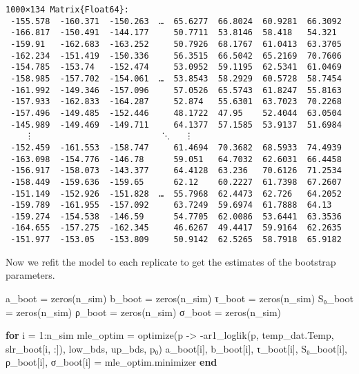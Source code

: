 \documentclass[
  letterpaper,
  DIV=11,
  numbers=noendperiod]{scrartcl}
\newenvironment{Shaded}{\begin{snugshade}}{\end{snugshade}}
\newcommand{\ControlFlowTok}[1]{\textcolor[rgb]{0.00,0.23,0.31}{\textbf{#1}}}
\newcommand{\FloatTok}[1]{\textcolor[rgb]{0.68,0.00,0.00}{#1}}
\newcommand{\FunctionTok}[1]{\textcolor[rgb]{0.28,0.35,0.67}{#1}}
\newcommand{\NormalTok}[1]{\textcolor[rgb]{0.00,0.23,0.31}{#1}}
\newcommand{\OperatorTok}[1]{\textcolor[rgb]{0.37,0.37,0.37}{#1}}
\begin{document}
\begin{verbatim}
1000×134 Matrix{Float64}:
 -155.578  -160.371  -150.263  …  65.6277  66.8024  60.9281  66.3092
 -166.817  -150.491  -144.177     50.7711  53.8146  58.418   54.321
 -159.91   -162.683  -163.252     50.7926  68.1767  61.0413  63.3705
 -162.234  -151.419  -150.336     56.3515  66.5042  65.2169  70.7606
 -154.785  -153.74   -152.474     53.0952  59.1195  62.5341  61.0469
 -158.985  -157.702  -154.061  …  53.8543  58.2929  60.5728  58.7454
 -161.992  -149.346  -157.096     57.0526  65.5743  61.8247  55.8163
 -157.933  -162.833  -164.287     52.874   55.6301  63.7023  70.2268
 -157.496  -149.485  -152.446     48.1722  47.95    52.4044  63.0504
 -145.989  -149.469  -149.711     64.1377  57.1585  53.9137  51.6984
    ⋮                          ⋱   ⋮                         
 -152.459  -161.553  -158.747     61.4694  70.3682  68.5933  74.4939
 -163.098  -154.776  -146.78      59.051   64.7032  62.6031  66.4458
 -156.917  -158.073  -143.377     64.4128  63.236   70.6126  71.2534
 -158.449  -159.636  -159.65      62.12    60.2227  61.7398  67.2607
 -151.149  -152.926  -151.828  …  55.7968  62.4473  62.726   64.2052
 -159.789  -161.955  -157.092     63.7249  59.6974  61.7888  64.13
 -159.274  -154.538  -146.59      54.7705  62.0086  53.6441  63.3536
 -164.655  -157.275  -162.345     46.6267  49.4417  59.9164  62.2635
 -151.977  -153.05   -153.809     50.9142  62.5265  58.7918  65.9182
\end{verbatim}

Now we refit the model to each replicate to get the estimates of the
bootstrap parameters.

\begin{Shaded}
\begin{Highlighting}[]
\NormalTok{a\_boot }\OperatorTok{=} \FunctionTok{zeros}\NormalTok{(n\_sim)}
\NormalTok{b\_boot }\OperatorTok{=} \FunctionTok{zeros}\NormalTok{(n\_sim)}
\NormalTok{τ\_boot }\OperatorTok{=} \FunctionTok{zeros}\NormalTok{(n\_sim)}
\NormalTok{S₀\_boot }\OperatorTok{=} \FunctionTok{zeros}\NormalTok{(n\_sim)}
\NormalTok{ρ\_boot }\OperatorTok{=} \FunctionTok{zeros}\NormalTok{(n\_sim)}
\NormalTok{σ\_boot }\OperatorTok{=} \FunctionTok{zeros}\NormalTok{(n\_sim)}

\ControlFlowTok{for}\NormalTok{ i }\OperatorTok{=} \FloatTok{1}\OperatorTok{:}\NormalTok{n\_sim}
\NormalTok{    mle\_optim }\OperatorTok{=} \FunctionTok{optimize}\NormalTok{(p }\OperatorTok{{-}\textgreater{}} \FunctionTok{{-}ar1\_loglik}\NormalTok{(p, temp\_dat.Temp, slr\_boot[i, }\OperatorTok{:}\NormalTok{]), low\_bds, up\_bds, p₀)}
\NormalTok{    a\_boot[i], b\_boot[i], τ\_boot[i], S₀\_boot[i], ρ\_boot[i], σ\_boot[i] }\OperatorTok{=}\NormalTok{ mle\_optim.minimizer}
\ControlFlowTok{end}
\end{Highlighting}
\end{Shaded}
\end{document}
